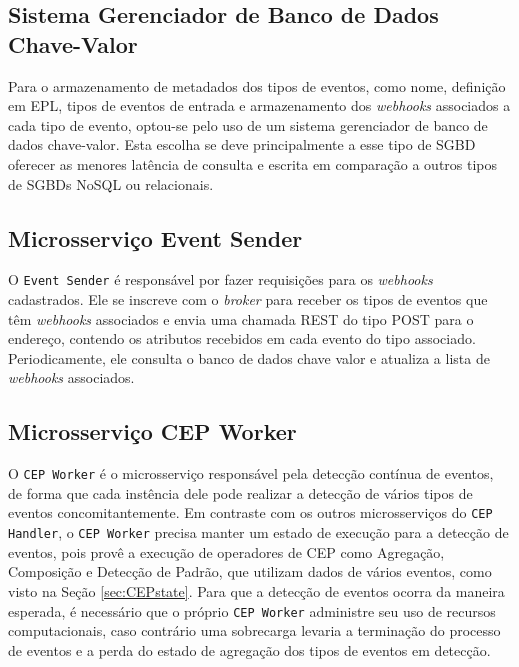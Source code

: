 \subsection{Sistema Gerenciador de Banco de Dados Chave-Valor}
\label{sec:key-value-sgbd}
Para o armazenamento de metadados dos tipos de eventos, como nome, definição em EPL, tipos de eventos de entrada e armazenamento dos \textit{webhooks} associados a cada tipo de evento, optou-se pelo uso de um sistema gerenciador de banco de dados chave-valor. Esta escolha se deve principalmente a esse tipo de SGBD oferecer as menores latência de consulta e escrita em comparação a outros tipos de SGBDs NoSQL ou relacionais. 

\subsection{Microsserviço Event Sender} \label{sec:eventsender}

O \texttt{Event Sender} é responsável por fazer requisições para os \textit{webhooks} cadastrados. 
Ele se inscreve com o \textit{broker} %
para receber os tipos de eventos que têm \textit{webhooks} associados e envia uma chamada REST do tipo POST para o endereço, contendo os atributos recebidos em cada evento do tipo associado. Periodicamente, ele consulta o banco de dados chave valor e atualiza a lista de \textit{webhooks} associados.

\subsection{Microsserviço CEP Worker} \label{sec:cepworker}

O \texttt{CEP Worker} é o microsserviço responsável pela detecção contínua de eventos, de forma que cada instência dele pode realizar a detecção de vários tipos de eventos concomitantemente.
Em contraste com os outros microsserviços do \texttt{CEP Handler}, o \texttt{CEP Worker} precisa manter um estado de execução para a detecção de eventos, pois provê a execução de operadores de CEP como Agregação, Composição e Detecção de Padrão, que utilizam dados de vários eventos, como visto na Seção \ref{sec:CEPstate}. Para que a detecção de eventos ocorra da maneira esperada, é necessário que o próprio \texttt{CEP Worker} administre seu uso de recursos computacionais, caso contrário uma sobrecarga levaria a terminação do processo de eventos e a perda do estado de agregação dos tipos de eventos em detecção.


